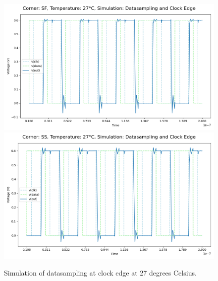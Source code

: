 \begin{figure}[H]
    \vspace{5pt}
    \includegraphics[height= 0.21\textheight]{figures/aimspice/SF27W1.png}
    \vspace{5pt}
    \includegraphics[height= 0.21\textheight]{figures/aimspice/SS27W1.png}
    \caption{Simulation of datasampling at clock edge at 27 degrees Celsius.}
    \label{fig:aimspice_W1_27}
\end{figure}

\pagebreak

